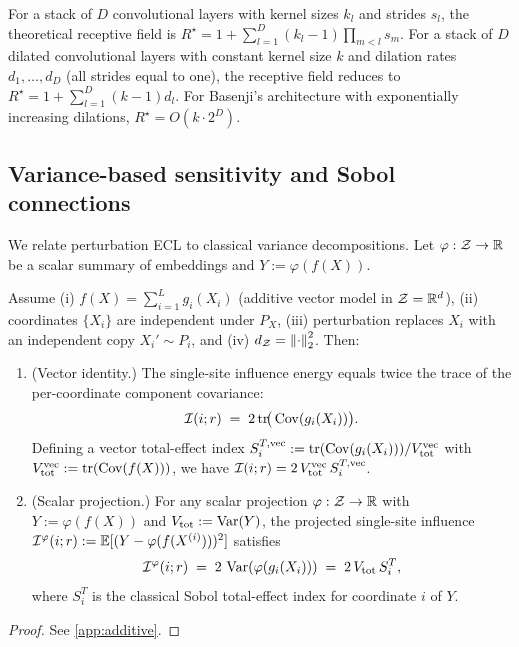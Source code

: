\begin{remark}
For a stack of $D$ convolutional layers with kernel sizes $k_l$ and strides $s_l$, the theoretical receptive field is $R^\star = 1 + \sum_{l=1}^D (k_l - 1) \prod_{m<l} s_m$. For a stack of $D$ dilated convolutional layers with constant kernel size $k$ and dilation rates $d_1, \dots, d_D$ (all strides equal to one), the receptive field reduces to $R^\star = 1 + \sum_{l=1}^D (k-1) d_l$. For Basenji's architecture with exponentially increasing dilations, $R^\star = O(k \cdot 2^D)$.
\end{remark}

\subsection{Variance-based sensitivity and Sobol connections}\label{sec:sobol}

We relate perturbation ECL to classical variance decompositions. Let $\varphi:\mathcal{Z}\to \mathbb{R}$ be a scalar summary of embeddings and $Y:=\varphi(f(X))$.

\begin{theorem}\label{thm:sobol_equiv}
Assume (i) $f(X) = \sum_{i=1}^L g_i(X_i)$ (additive vector model in $\mathcal{Z} = \mathbb{R}^d$), (ii) coordinates $\{X_i\}$ are independent under $P_X$, (iii) perturbation replaces $X_i$ with an independent copy $X_i' \sim P_i$, and (iv) $d_{\mathcal{Z}} = \left\lVert \cdot \right\rVert_2^2$. Then:
\begin{enumerate}[leftmargin=2em, label=(\alph*)]
\item (Vector identity.) The single-site influence energy equals twice the trace of the per-coordinate component covariance:
\[
\mathcal{I}(i;r) \;=\; 2\,\mathrm{tr}\!\big(\operatorname{Cov}(g_i(X_i))\big).
\]
Defining a vector total-effect index $S_i^{T,\mathrm{vec}} := \mathrm{tr}(\operatorname{Cov}(g_i(X_i)))/V_{\mathrm{tot}}^{\mathrm{vec}}$ with $V_{\mathrm{tot}}^{\mathrm{vec}} := \mathrm{tr}(\operatorname{Cov}(f(X)))$, we have $\mathcal{I}(i;r) = 2\,V_{\mathrm{tot}}^{\mathrm{vec}}\, S_i^{T,\mathrm{vec}}$.
\item (Scalar projection.) For any scalar projection $\varphi:\mathcal{Z}\to\mathbb{R}$ with $Y := \varphi(f(X))$ and $V_{\mathrm{tot}} := \operatorname{Var}(Y)$, the projected single-site influence $\mathcal{I}^{\varphi}(i;r) := \mathbb{E}[(Y - \varphi(f(X^{(i)})))^2]$ satisfies
\[
\mathcal{I}^{\varphi}(i;r) \;=\; 2\,\operatorname{Var}(\varphi(g_i(X_i))) \;=\; 2\,V_{\mathrm{tot}}\, S_i^T,
\]
where $S_i^T$ is the classical Sobol total-effect index for coordinate $i$ of $Y$.
\end{enumerate}
\end{theorem}
\begin{proof}
See \cref{app:additive}.
\end{proof}

